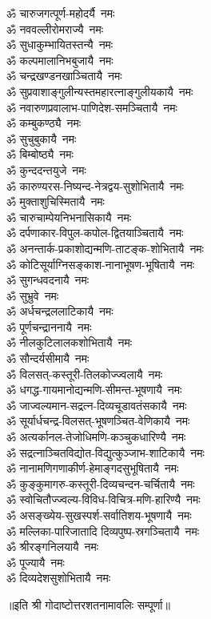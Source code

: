 \begin{multicols}{2}
\begin{flushleft}
ॐ चारुजगत्पूर्ण-महोदर्यै~नमः\\
ॐ नववल्लीरोमराज्यै~नमः\\
ॐ सुधाकुम्भायितस्तन्यै~नमः\\
ॐ कल्पमालानिभबुजायै~नमः\\
ॐ चन्द्रखण्डनखाञ्चितायै~नमः\hfill{}\\
ॐ सुप्रवाशाङ्गुलीन्यस्तमहा\-रत्नाङ्गुलीयकायै~नमः\\
ॐ नवारुणप्रवालाभ-पाणिदेश-समञ्चितायै~नमः\\
ॐ कम्बुकण्ठ्यै~नमः\\
ॐ सुचुबुकायै~नमः\\
ॐ बिम्बोष्ठ्यै~नमः\\
ॐ कुन्ददन्तयुजे~नमः\\
ॐ कारुण्यरस-निष्यन्द-नेत्रद्वय-सुशोभितायै~नमः\\
ॐ मुक्ताशुचिस्मितायै~नमः\\
ॐ चारुचाम्पेयनिभनासिकायै~नमः\\
ॐ दर्पणाकार-विपुल-कपोल-द्वितयाञ्चितायै~नमः\hfill{}\\
ॐ अनन्तार्क-प्रकाशोद्यन्मणि-ताटङ्क-शोभितायै~नमः\\
ॐ कोटिसूर्याग्निसङ्काश-नानाभूषण-भूषितायै~नमः\\
ॐ सुगन्धवदनायै~नमः\\
ॐ सुभ्रुवे~नमः\\
ॐ अर्धचन्द्रललाटिकायै~नमः\\
ॐ पूर्णचन्द्राननायै~नमः\\
ॐ नीलकुटिलालकशोभितायै~नमः\\
ॐ सौन्दर्यसीमायै~नमः\\
ॐ विलसत्-कस्तूरी-तिलकोज्ज्वलायै~नमः\\
ॐ धगद्ध-गायमानोद्यन्मणि-सीमन्त-भूषणायै~नमः\hfill{}\\
ॐ जाज्वल्यमान-सद्रत्न-दिव्यचूडावतंसकायै~नमः\\
ॐ सूर्यार्धचन्द्र-विलसत्-भूषणञ्चित-वेणिकायै~नमः\\
ॐ अत्यर्कानल-तेजोधिमणि-कञ्चुकधारिण्यै~नमः\\
ॐ सद्रत्नाञ्चितविद्योत-विद्युत्कुञ्जाभ-शाटिकायै~नमः\\
ॐ नानामणिगणाकीर्ण-हेमाङ्गदसुभूषितायै~नमः\\
ॐ कुङ्कुमागरु-कस्तूरी-दिव्यचन्दन-चर्चितायै~नमः\\
ॐ स्वोचितौज्ज्वल्य-विविध-विचित्र-मणि-हारिण्यै~नमः\\
ॐ असङ्ख्येय-सुखस्पर्श-सर्वातिशय-भूषणायै~नमः\\
ॐ मल्लिका-पारिजातादि  दिव्यपुष्प-स्रगञ्चितायै~नमः\\
ॐ श्रीरङ्गनिलयायै~नमः\hfill{}\\
ॐ पूज्यायै~नमः\\
ॐ दिव्यदेशसुशोभितायै~नमः\\
\end{flushleft}
\end{multicols}
॥इति श्री गोदाष्टोत्तरशतनामावलिः सम्पूर्णा॥
